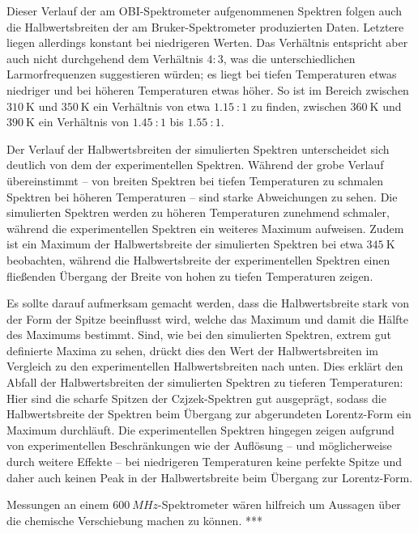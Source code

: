 Dieser Verlauf der am OBI-Spektrometer aufgenommenen Spektren folgen auch die Halbwertsbreiten der am Bruker-Spektrometer produzierten Daten. Letztere liegen allerdings konstant bei niedrigeren Werten. Das Verhältnis entspricht aber auch nicht durchgehend dem Verhältnis $4:3$, was die unterschiedlichen Larmorfrequenzen suggestieren würden; es liegt bei tiefen Temperaturen etwas niedriger und bei höheren Temperaturen etwas höher. So ist im Bereich zwischen $\SI{310}{\kelvin}$ und $\SI{350}{\kelvin}$ ein Verhältnis von etwa $\SI{1.15}{}:1$ zu finden, zwischen $\SI{360}{\kelvin}$ und $\SI{390}{\kelvin}$ ein Verhältnis von $\SI{1.45}{}:1$ bis $\SI{1.55}{}:1$.

Der Verlauf der Halbwertsbreiten der simulierten Spektren unterscheidet sich deutlich von dem der experimentellen Spektren. Während der grobe Verlauf übereinstimmt -- von breiten Spektren bei tiefen Temperaturen zu schmalen Spektren bei höheren Temperaturen -- sind starke Abweichungen zu sehen. Die simulierten Spektren werden zu höheren Temperaturen zunehmend schmaler, während die experimentellen Spektren ein weiteres Maximum aufweisen. Zudem ist ein Maximum der Halbwertsbreite der simulierten Spektren bei etwa $\SI{345}{\kelvin}$ beobachten, während die Halbwertsbreite der experimentellen Spektren einen fließenden Übergang der Breite von hohen zu tiefen Temperaturen zeigen.

Es sollte darauf aufmerksam gemacht werden, dass die Halbwertsbreite stark von der Form der Spitze beeinflusst wird, welche das Maximum und damit die Hälfte des Maximums bestimmt. Sind, wie bei den simulierten Spektren, extrem gut definierte Maxima zu sehen, drückt dies den Wert der Halbwertsbreiten im Vergleich zu den experimentellen Halbwertsbreiten nach unten. Dies erklärt den Abfall der Halbwertsbreiten der simulierten Spektren zu tieferen Temperaturen: Hier sind die scharfe Spitzen der Czjzek-Spektren gut ausgeprägt, sodass die Halbwertsbreite der Spektren beim Übergang zur abgerundeten Lorentz-Form ein Maximum durchläuft. Die experimentellen Spektren hingegen zeigen aufgrund von experimentellen Beschränkungen wie der Auflösung -- und möglicherweise durch weitere Effekte -- bei niedrigeren Temperaturen keine perfekte Spitze und daher auch keinen Peak in der Halbwertsbreite beim Übergang zur Lorentz-Form.


Messungen an einem $\SI{600}{MHz}$-Spektrometer wären hilfreich um Aussagen über die chemische Verschiebung machen zu können. *** 



